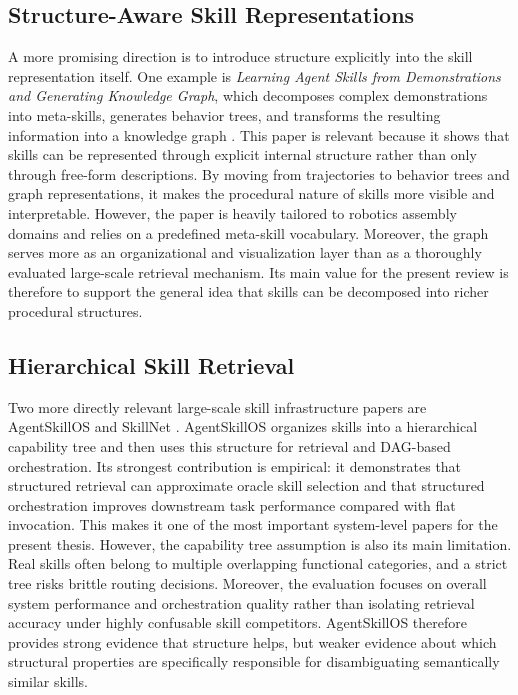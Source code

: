 \documentclass[a4paper]{article}
\begin{document}
\subsection{Structure-Aware Skill Representations}
A more promising direction is to introduce structure explicitly into the skill representation itself. One example is \emph{Learning Agent Skills from Demonstrations and Generating Knowledge Graph}, which decomposes complex demonstrations into meta-skills, generates behavior trees, and transforms the resulting information into a knowledge graph \cite{learningkg2026}. This paper is relevant because it shows that skills can be represented through explicit internal structure rather than only through free-form descriptions. By moving from trajectories to behavior trees and graph representations, it makes the procedural nature of skills more visible and interpretable. However, the paper is heavily tailored to robotics assembly domains and relies on a predefined meta-skill vocabulary. Moreover, the graph serves more as an organizational and visualization layer than as a thoroughly evaluated large-scale retrieval mechanism. Its main value for the present review is therefore to support the general idea that skills can be decomposed into richer procedural structures.

\subsection{Hierarchical Skill Retrieval}
Two more directly relevant large-scale skill infrastructure papers are AgentSkillOS and SkillNet \cite{li2026agentskillos, liang2026skillnet}. AgentSkillOS organizes skills into a hierarchical capability tree and then uses this structure for retrieval and DAG-based orchestration. Its strongest contribution is empirical: it demonstrates that structured retrieval can approximate oracle skill selection and that structured orchestration improves downstream task performance compared with flat invocation. This makes it one of the most important system-level papers for the present thesis. However, the capability tree assumption is also its main limitation. Real skills often belong to multiple overlapping functional categories, and a strict tree risks brittle routing decisions. Moreover, the evaluation focuses on overall system performance and orchestration quality rather than isolating retrieval accuracy under highly confusable skill competitors. AgentSkillOS therefore provides strong evidence that structure helps, but weaker evidence about which structural properties are specifically responsible for disambiguating semantically similar skills.
\end{document}
